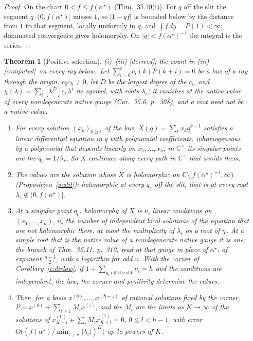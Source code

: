 \documentclass[11pt]{article}
\theoremstyle{plain}
\newtheorem{theorem}[proposition]{Theorem}
\theoremstyle{definition}
\theoremstyle{remark}
\newcommand{\derived}{\textup{[derived]}}
\newcommand{\computed}{\textup{[computed]}}
\begin{document}
\begin{proof}
On the chart $0<f\le f(\alpha^\star)$ (Thm.~35.10(i)). For $q$ off the slit the segment $q\cdot(0,f(\alpha^\star)]$ misses $1$, so $|1-qf|$ is bounded below by the distance from $1$ to that segment, locally uniformly in $q$, and $\int f\,dy=P(1)<\infty$; dominated convergence gives holomorphy. On $|q|<f(\alpha^\star)^{-1}$ the integral is the series.
\end{proof}

\begin{theorem}[Positive selection]\label{t:select}(i)--(iii) \derived; the count in (iii) \computed\ on every ray below.\
Let $\sum_{i=0}^hc_i(k)P(k+i)=0$ be a law of a ray through the origin, $c_0c_h\ne0$, let $D$ be the largest degree of the $c_i$, and $\chi(\lambda)=\sum_i[k^D]c_i\,\lambda^i$ its symbol, with roots $\lambda_c$; it vanishes at the native value of every nondegenerate native gauge (Cor.~35.6, p.~308), and a root need not be a native value.
\begin{enumerate}[label=(\roman*)]
\item For every solution $(x_k)_{k\ge1}$ of the law, $X(q)=\sum_kx_kq^{k-1}$ satisfies a linear differential equation in $q$ with polynomial coefficients, inhomogeneous by a polynomial that depends linearly on $x_1,\dots,x_h$; in $\mathbb C^\times$ its singular points are the $q_c=1/\lambda_c$. So $X$ continues along every path in $\mathbb C^\times$ that avoids them.
\item The values are the solution whose $X$ is holomorphic on $\mathbb C\setminus[f(\alpha^\star)^{-1},\infty)$ (Proposition~\ref{p:slit}): holomorphic at every $q_c$ off the slit, that is at every root $\lambda_c\notin(0,f(\alpha^\star)]$.
\item At a singular point $q_c$, holomorphy of $X$ is $\nu_c$ linear conditions on $(x_1,\dots,x_h)$, $\nu_c$ the number of independent local solutions of the equation that are not holomorphic there, at most the multiplicity of $\lambda_c$ as a root of $\chi$. At a simple root that is the native value of a nondegenerate native gauge it is one: the branch of Thm.~35.11, p.~310, read at that gauge in place of $\alpha^\star$, of exponent $\frac{n-3}2$, with a logarithm for odd $n$. With the corner of Corollary~\ref{c:dirlaw}, if $1+\sum_{q_c\text{ off the slit}}\nu_c=h$ and the conditions are independent, the law, the corner and positivity determine the values.
\item Then, for a basis $x^{(0)},\dots,x^{(h-1)}$ of rational solutions fixed by the corner, $P=x^{(0)}+\sum_{i\ge1}M_ix^{(i)}$, and the $M_i$ are the limits as $K\to\infty$ of the solutions of $x^{(0)}_{K+l}+\sum_iM_ix^{(i)}_{K+l}=0$, $0\le l<h-1$, with error $O\big((f(\alpha^\star)/\min_{c\ne\star}|\lambda_c|)^K\big)$ up to powers of $K$.
\end{enumerate}
\end{theorem}
\end{document}
